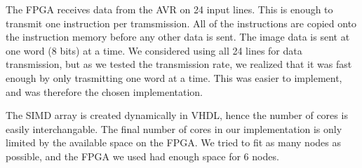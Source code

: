 The \ac{FPGA} receives data from the AVR on 24 input lines. This is enough to
transmit one instruction per tramsmission. All of the instructions are copied
onto the instruction memory before any other data is sent. The image data is
sent at one word (8 bits) at a time. We considered using all 24 lines for data
transmission, but as we tested the transmission rate, we realized that it was
fast enough by only trasmitting one word at a time. This was easier to
implement, and was therefore the chosen implementation.

The \ac{SIMD} array is created dynamically in \ac{VHDL}, hence the number of
cores is easily interchangable. The final number of cores in our implementation
is only limited by the available space on the \ac{FPGA}. We tried to fit as many
nodes as possible, and the \ac{FPGA} we used had enough space for 6 nodes.
